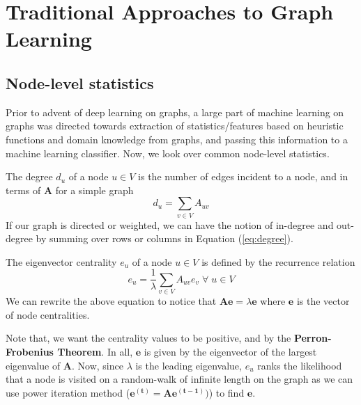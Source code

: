 \section{Traditional Approaches to Graph Learning}
\subsection{Node-level statistics}
Prior to advent of deep learning on graphs, a large part of machine learning on graphs was directed towards extraction of statistics/features based on heuristic functions and domain knowledge from graphs, and passing this information to a machine learning classifier. Now, we look over common node-level statistics.
\begin{definition}
The degree $d_u$ of a node $u \in V$ is the number of edges incident to a node, and in terms of $\mathbf{A}$ for a simple graph
\begin{equation} \label{eq:degree}
	d_u = \sum_{v \in V} A_{uv}
\end{equation}
If our graph is directed or weighted, we can have the notion of in-degree and out-degree by summing over rows or columns in Equation (\ref{eq:degree}).
\end{definition}
 \label{thm:perron}
\begin{definition}
The eigenvector centrality $e_u$ of a node $u \in V$ is defined by the recurrence relation
\begin{equation}
	e_u = \dfrac{1}{\lambda} \sum_{v\in V} A_{uv}e_v \; \forall \; u \in V
\end{equation}	
We can rewrite the above equation to notice that $\mathbf{A}\mathbf{e} = \lambda \mathbf{e}$ where $\mathbf{e}$ is the vector of node centralities.
\end{definition}
Note that, we want the centrality values to be positive, and by the \textbf{Perron-Frobenius Theorem}. 
In all, $\mathbf{e}$ is given by the eigenvector of the largest eigenvalue of $\mathbf{A}$. 
Now, since $\lambda$ is the leading eigenvalue, $e_u$ ranks the likelihood that a node is visited on a random-walk of infinite length on the graph as we can use power iteration method ($\mathbf{e^{(t)}} = \mathbf{A}\mathbf{e^{(t-1)}})$) to find $\mathbf{e}$. \\
